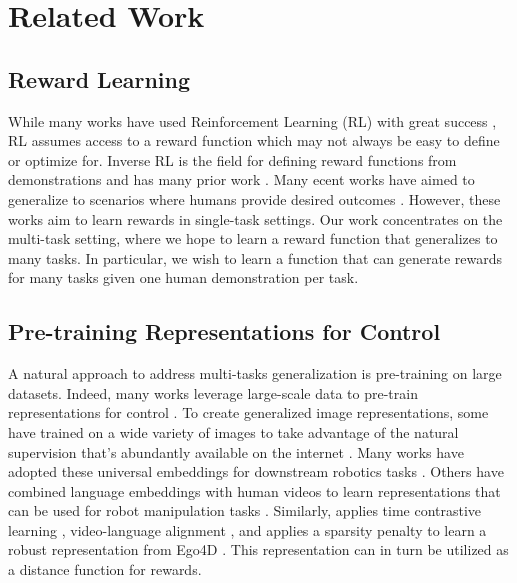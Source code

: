 \section{Related Work}
\label{sec:related_work_reward}

\subsection{Reward Learning}

While many works have used Reinforcement Learning (RL) with great success \cite{silver2017alphago, Vinyals2019GrandmasterLI, rma, agarwal2023legged}, RL assumes access to a reward function which may not always be easy to define or optimize for. Inverse RL is the field for defining reward functions from demonstrations and has many prior work \cite{ziebart2008maximum, ratliff2006mmp, wulfmeier2015DeepIRL, levine2018maxent}. Many ecent works have aimed to generalize to scenarios where humans provide desired outcomes \cite{fu2018variational, singh2019end}. However, these works aim to learn rewards in single-task settings. Our work concentrates on the multi-task setting, where we hope to learn a reward function that generalizes to many tasks. In particular, we wish to learn a function that can generate rewards for many tasks given one human demonstration per task.


\subsection{Pre-training Representations for Control} 

A natural approach to address multi-tasks generalization is pre-training on large datasets. Indeed, many works  leverage large-scale data to pre-train representations for control \cite{Parisi2022TheUE, Cui2022CanFM, r3m, VIP, shah2021rrl, radasavovic22robotmaskedpretraining}. To create generalized image representations, some have trained on a wide variety of images to take advantage of the natural supervision that’s abundantly available on the internet \cite{radford21clip}. Many works have adopted these universal embeddings for downstream robotics tasks \cite{shridhar2022cliport, jang2022bc}. Others have combined language embeddings with human videos to learn representations that can be used for robot manipulation tasks \cite{shao2021concept2robot}. Similarly, \cite{r3m} applies time contrastive learning \cite{sermanet18timecontrastive}, video-language alignment \cite{nair2021lorel}, and applies a sparsity penalty to learn a robust representation from Ego4D \cite{ego4d}. This representation can in turn be utilized as a distance function for rewards.


